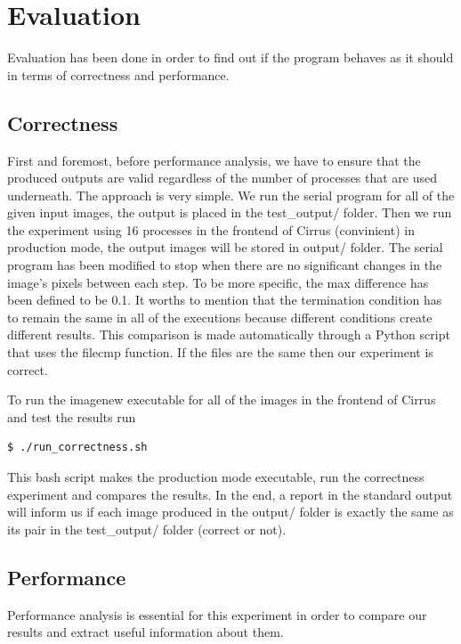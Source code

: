 \documentclass[12pt,a4paper]{article}
\begin{document}
\section{Evaluation}
    Evaluation has been done in order to find out if the program behaves as it should in terms of correctness and performance.

    \subsection{Correctness}
        First and foremost, before performance analysis, we have to ensure that the produced outputs are valid regardless of the number of processes that are used underneath. The approach is very simple. We run the serial program for all of the given input images, the output is placed in the test\_output/ folder. Then we run the experiment using 16 processes in the frontend of Cirrus (convinient) in production mode, the output images will be stored in output/ folder. The serial program has been modified to stop when there are no significant changes in the image's pixels between each step. To be more specific, the max difference has been defined to be 0.1. It worths to mention that the termination condition has to remain the same in all of the executions because different conditions create different results. This comparison is made automatically through a Python script that uses the filecmp function. If the files are the same then our experiment is correct.

        To run the imagenew executable for all of the images in the frontend of Cirrus and test the results run
        \begin{lstlisting}[language=bash]
          $ ./run_correctness.sh
        \end{lstlisting}

        This bash script makes the production mode executable, run the correctness experiment and compares the results. In the end, a report in the standard output will inform us if each image produced in the output/ folder is exactly the same as its pair in the test\_output/ folder (correct or not).

    \subsection{Performance}
        Performance analysis is essential for this experiment in order to compare our results and extract useful information about them.
\end{document}
